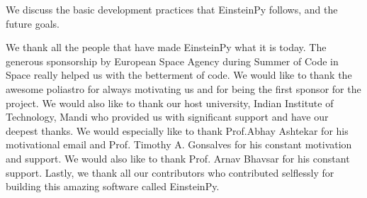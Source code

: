 \documentclass[onecolumn]{aa}
\begin{document}
We discuss the basic development practices that EinsteinPy follows, and the future goals.



\begin{acknowledgements}
      We thank all the people that have made EinsteinPy what it is today.  
The generous sponsorship by European Space Agency during Summer of Code in Space really helped us with the betterment of code. We would like to thank the awesome poliastro \citep{juan_luis_cano_rodriguez_2019_3588160} for always motivating us and for being the first sponsor for the project. We would also like to thank our host university, Indian Institute of Technology, Mandi who provided us with significant support and have our deepest thanks.
We would especially like to thank Prof.Abhay Ashtekar for his motivational email and  Prof. Timothy A. Gonsalves for his constant motivation and support. We would also like to thank Prof. Arnav Bhavsar for his constant support.
Lastly, we thank all our contributors who contributed selflessly for building this amazing software called EinsteinPy.
      
\end{acknowledgements}

%
%





\end{document}
